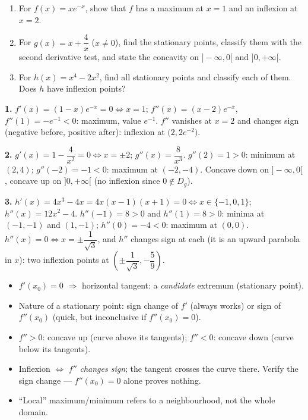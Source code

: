\documentclass[11pt]{article}
\begin{document}
\begin{exercice}[Practice]
\begin{enumerate}
\item For $f(x)=xe^{-x}$, show that $f$ has a maximum at $x=1$ and an inflexion at $x=2$.
\item For $g(x)=x+\dfrac{4}{x}$ ($x\neq 0$), find the stationary points, classify them with the second derivative test, and state the concavity on $]-\infty,0[$ and $]0,+\infty[$.
\item For $h(x)=x^4-2x^2$, find all stationary points and classify each of them. Does $h$ have inflexion points?
\end{enumerate}
\end{exercice}

\begin{corrige}[Exercise 1]
\textbf{1.} $f'(x)=(1-x)e^{-x}=0 \iff x=1$; $f''(x)=(x-2)e^{-x}$, $f''(1)=-e^{-1}<0$: maximum, value $e^{-1}$. $f''$ vanishes at $x=2$ and changes sign (negative before, positive after): inflexion at $\bigl(2, 2e^{-2}\bigr)$.

\textbf{2.} $g'(x)=1-\dfrac{4}{x^2}=0 \iff x=\pm 2$; $g''(x)=\dfrac{8}{x^3}$. $g''(2)=1>0$: minimum at $(2,4)$; $g''(-2)=-1<0$: maximum at $(-2,-4)$. Concave down on $]-\infty,0[$, concave up on $]0,+\infty[$ (no inflexion since $0 \notin D_g$).

\textbf{3.} $h'(x)=4x^3-4x=4x(x-1)(x+1)=0 \iff x\in\{-1,0,1\}$; $h''(x)=12x^2-4$. $h''(-1)=8>0$ and $h''(1)=8>0$: minima at $(-1,-1)$ and $(1,-1)$; $h''(0)=-4<0$: maximum at $(0,0)$. $h''(x)=0 \iff x=\pm\dfrac{1}{\sqrt{3}}$, and $h''$ changes sign at each (it is an upward parabola in $x$): two inflexion points at $\left(\pm\dfrac{1}{\sqrt{3}}, -\dfrac{5}{9}\right)$.
\end{corrige}

\begin{aretenir}
\begin{itemize}
\item $f'(x_0)=0$ $\Rightarrow$ horizontal tangent: a \emph{candidate} extremum (stationary point).
\item Nature of a stationary point: sign change of $f'$ (always works) or sign of $f''(x_0)$ (quick, but inconclusive if $f''(x_0)=0$).
\item $f''>0$: concave up (curve above its tangents); $f''<0$: concave down (curve below its tangents).
\item Inflexion $\iff$ $f''$ \emph{changes sign}; the tangent crosses the curve there. Verify the sign change --- $f''(x_0)=0$ alone proves nothing.
\item ``Local'' maximum/minimum refers to a neighbourhood, not the whole domain.
\end{itemize}
\end{aretenir}
\end{document}
